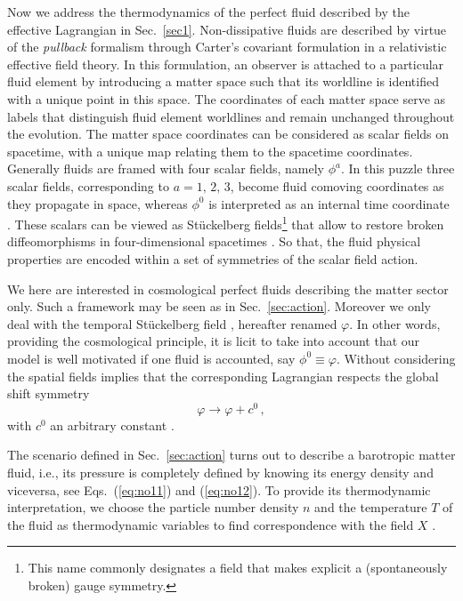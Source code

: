 \documentclass[twocolumn,showpacs, nofootinbib,aps,superscriptaddress, eqsecnum,prd,prl,notitlepage,showkeys,10pt,reprint]{revtex4-1}
\begin{document}
Now we address the thermodynamics of the perfect fluid described by the effective Lagrangian in Sec.~\ref{sec1}. Non-dissipative fluids are described by virtue of the \textit{pullback} formalism \cite{1993CQGra..10.2317C,1994CQGra..11..709C,2007LRR....10....1A} through Carter's covariant formulation \cite{1989LNM..1385....1C} in a relativistic effective field theory. In this formulation, an observer is attached to a particular fluid element by introducing a matter space such that its worldline is identified with a unique point in this space. The coordinates of each matter space serve as labels that distinguish fluid element worldlines and remain unchanged throughout the evolution. The matter space coordinates can be considered as scalar fields on spacetime, with a unique map relating them to the spacetime coordinates.
Generally fluids are framed with four scalar fields, namely  $\phi^a$.
In this puzzle three scalar fields, corresponding to $a=1,\,2,\,3$, become fluid comoving coordinates  as they propagate in space, whereas $\phi^0$ is interpreted as an internal time coordinate \cite{2016PhRvD..94l4023B,2016PhRvD..94b5034B,2017arXiv171101961C}.
These scalars can be viewed as St\"uckelberg fields\footnote{This name commonly designates a field that makes explicit a (spontaneously broken) gauge symmetry.} that allow to restore broken diffeomorphisms in four-dimensional spacetimes \cite{2016PhRvD..94l4023B,2003AnPhy.305...96A,2004JHEP...10..076D,2008PhyU...51..759R}. So that, the fluid physical properties are encoded within a set of symmetries of the scalar field action.

We here are interested in cosmological perfect fluids describing the matter sector only. Such a framework may be seen as in Sec.~\ref{sec:action}. Moreover we only deal with the temporal St\"uckelberg field \cite{Matarrese:1984zw,2016PhRvD..94l4023B,2016PhRvD..94b5034B}, hereafter renamed $\varphi$. In other words, providing the cosmological principle, it is licit to take into account that our model is well motivated if one fluid is accounted, say $\phi^0\equiv\varphi$. Without considering the spatial fields implies that the corresponding Lagrangian respects the global shift symmetry
%
\begin{equation}
\varphi\rightarrow \varphi+c^0\,,
\end{equation}
%
with $c^0$ an arbitrary constant \cite{2016PhRvD..94l4023B,2016PhRvD..94b5034B}.

The scenario defined in Sec.~\ref{sec:action} turns out to describe a barotropic matter fluid, i.e., its pressure is completely defined by knowing its energy density and viceversa, see Eqs.~(\ref{eq:no11}) and (\ref{eq:no12}).
To provide its thermodynamic interpretation, we choose the particle number density $n$ and the temperature $T$ of the fluid as thermodynamic variables to find correspondence with the field $X$ \cite{2016PhRvD..94l4023B,2016PhRvD..94b5034B}.
\end{document}
